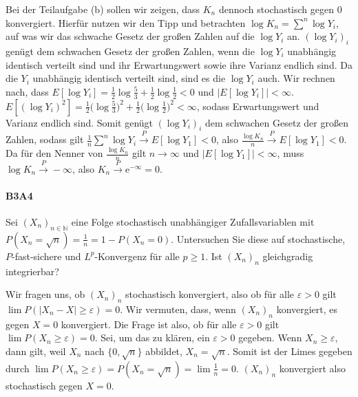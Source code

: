\documentclass{article}
\begin{document}
Bei der Teilaufgabe (b) sollen wir zeigen, dass $K_n$ dennoch stochastisch gegen 0 konvergiert.
Hierfür nutzen wir den Tipp und betrachten $\log K_n=\sum^n\log Y_i$, auf was wir das schwache Gesetz der großen Zahlen auf die $\log Y_i$ an.
$(\log Y_i)_i$ genügt dem schwachen Gesetz der großen Zahlen, wenn die $\log Y_i$ unabhängig identisch verteilt sind und ihr Erwartungswert sowie ihre Varianz endlich sind.
Da die $Y_i$ unabhängig identisch verteilt sind, sind es die $\log Y_i$ auch.
Wir rechnen nach, dass $E[\log Y_i]=\frac{1}{2}\log\frac{5}{3}+\frac{1}{2}\log\frac{1}{2}<0$ und $|E[\log Y_i]|<\infty$.
$E[(\log Y_i)^2]=\frac{1}{2}\bigl(\log\frac{5}{3}\bigr)^2+\frac{1}{2}\bigl(\log\frac{1}{2}\bigr)^2<\infty$, sodass Erwartungswert und Varianz endlich sind.
Somit genügt $(\log Y_i)_i$ dem schwachen Gesetz der großen Zahlen, sodass gilt $\frac{1}{n}\sum^n\log Y_i\xrightarrow{P}E[\log Y_1]<0$, also $\frac{\log K_n}{n}\xrightarrow{P}E[\log Y_1]<0$.
Da für den Nenner von $\frac{\log K_n}{n}$ gilt $n\to\infty$ und $|E[\log Y_1]|<\infty$, muss $\log K_n\xrightarrow{P}-\infty$, also $K_n\xrightarrow{P}\mathrm{e}^{-\infty}=0$.

\newpage
\paragraph{B3A4}
Sei $(X_n)_{n\in\mathbb{N}}$ eine Folge stochastisch unabhängiger Zufallsvariablen mit $P(X_n=\sqrt{n})=\frac{1}{n}=1-P(X_n=0)$.
Untersuchen Sie diese auf stochastische, $P$-fast-sichere und $L^p$-Konvergenz für alle $p\geq1$.
Ist $(X_n)_n$ gleichgradig integrierbar?

Wir fragen uns, ob $(X_n)_n$ stochastisch konvergiert, also ob für alle $\varepsilon>0$ gilt $\lim P(|X_n-X|\geq\varepsilon)=0$.
Wir vermuten, dass, wenn $(X_n)_n$ konvergiert, es gegen $X=0$ konvergiert.
Die Frage ist also, ob für alle $\varepsilon>0$ gilt $\lim P(X_n\geq\varepsilon)=0$.
Sei, um das zu klären, ein $\varepsilon>0$ gegeben.
Wenn $X_n\geq\varepsilon$, dann gilt, weil $X_n$ nach $\{0,\sqrt{n}\}$ abbildet, $X_n=\sqrt{n}$.
Somit ist der Limes gegeben durch $\lim P(X_n\geq\varepsilon)=P(X_n=\sqrt{n})=\lim\frac{1}{n}=0$.
$(X_n)_n$ konvergiert also stochastisch gegen $X=0$.
\end{document}
